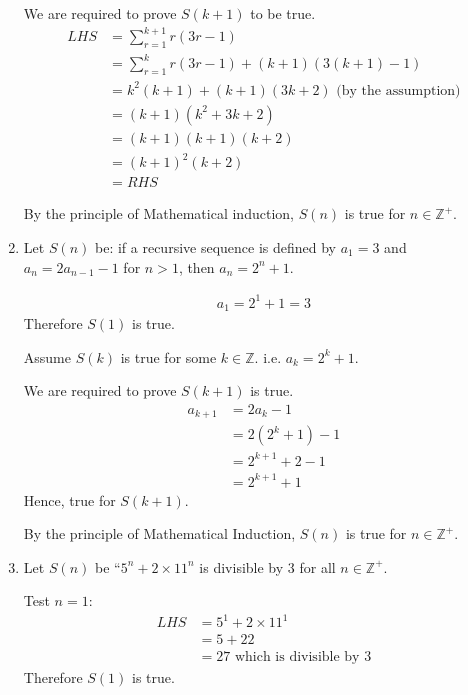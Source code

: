\documentclass[11pt, a4paper, oneside]{exam}
\theoremstyle{definition}\newtheorem{define}{Definition}[section]
\theoremstyle{remark}\newtheorem{remark}{Remark}
\theoremstyle{definition}\newtheorem{example}{Example}[subsection]
\theoremstyle{definition}\newtheorem{notation}{Notation}[section]
\theoremstyle{definition}\newtheorem{theorem}{Theorem}[section]
\theoremstyle{definition}\newtheorem{corollary}{Corollary}[section]
\begin{document}
\begin{enumerate}
We are required to prove $S(k+1)$ to be true.
\begin{align*}
LHS & =  \sum_{r=1}^{k+1} r(3r-1)\\
& =  \sum_{r=1}^k r(3r-1) + (k+1)(3(k+1)-1)\\
& = k^2(k+1) + (k+1)(3k+2) \mbox{ (by the assumption)}\\
& = (k+1)(k^2 + 3k + 2)\\
& = (k+1)(k+1)(k+2)\\
& = (k+1)^2(k+2)\\
& = RHS
\end{align*}

By the principle of Mathematical induction, $S(n)$ is true for $n \in \mathbb{Z}^+$.

\item %

  Let $S(n)$ be: if a recursive sequence is defined by $a_1 = 3$ and $a_n = 2a_{n-1} - 1$ for $n >1$, then $a_n = 2^n + 1$.

\begin{align*}
  a_1 = 2^1 + 1 = 3
\end{align*}
Therefore $S(1)$ is true.

Assume $S(k)$ is true for some $k \in \mathbb{Z}$. i.e. $a_k = 2^k + 1$.

We are required to prove $S(k+1)$ is true.
\begin{align*}
  a_{k+1} & = 2a_{k} - 1\\
          & = 2(2^k + 1) -1\\
          & = 2^{k+1} + 2 - 1\\
          & = 2^{k+1} + 1
\end{align*}
Hence, true for $S(k+1)$.

By the principle of Mathematical Induction, $S(n)$ is true for $n \in \mathbb{Z}^+$.



\item %

Let $S(n)$ be ``$5^n + 2\times 11^n$ is divisible by $3$ for all $n\in\mathbb{Z}^+$.

Test $n = 1$:
\begin{align*}
LHS & = 5^1 + 2\times 11^1 \\
& = 5 + 22\\
& = 27\mbox{ which is divisible by 3}
\end{align*}
Therefore $S(1)$ is true.


\end{enumerate}
\end{document}
